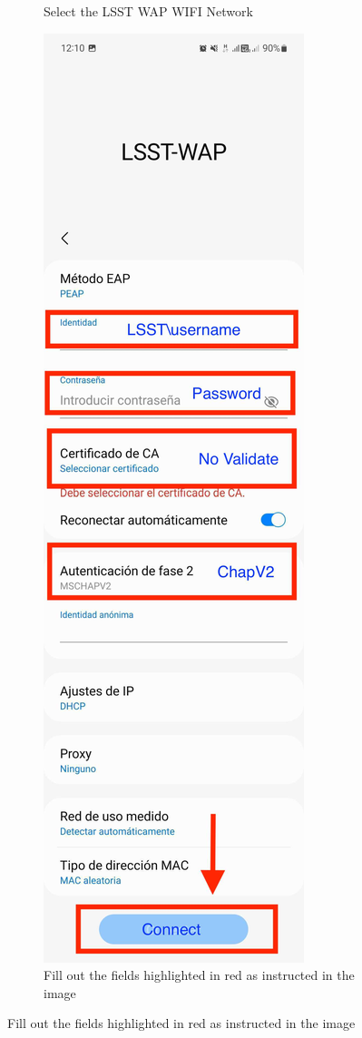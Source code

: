 \begin{figure}
\begin{subfigure}{0.30\textwidth}
      \caption*{Select the LSST WAP WIFI Network}
    \end{subfigure}
      \hfill
    \begin{subfigure}{0.30\textwidth}
      \centering
      \includegraphics[width=\textwidth]{Images/Android2.jpg}
      \caption*{Fill out the fields highlighted in red as instructed in the image}
    \end{subfigure}
  \end{figure}
